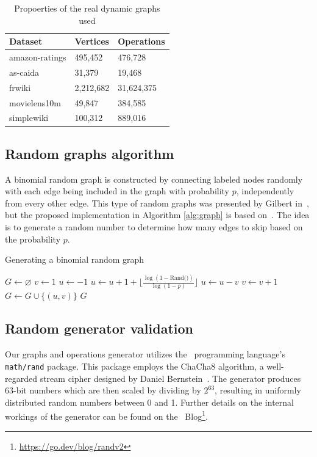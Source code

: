 \begin{table}[H]
\centering
\begin{tabular}{@{}lll@{}}
\toprule
Dataset        & Vertices  & Operations \\ \midrule
amazon-ratings & 495,452   & 476,728     \\
as-caida       & 31,379    & 19,468      \\
frwiki         & 2,212,682 & 31,624,375  \\
movielens10m   & 49,847    & 384,585     \\
simplewiki     & 100,312   & 889,016     \\ \bottomrule
\end{tabular}
\caption{Propoerties of the real dynamic graphs used \label{tab:dyngraphs}}
\end{table}

    \subsection*{Random graphs algorithm \label{sec:exp:rand_graph}}
    A binomial random graph is constructed by connecting labeled nodes randomly with each edge being included in the graph with probability $p$, independently from every other edge. This type of random graphs was presented by Gilbert in~\cite{Gilbert1959}, but the proposed implementation in Algorithm \ref{alg:graph} is based on~\cite{Batagelj2005}. The idea is to generate a random number to determine how many edges to skip based on the probability $p$.
    
    \begin{algorithm}[H]
    \caption{Generating a binomial random graph \label{alg:graph}}
    \begin{algorithmic}
            \State $G \gets \varnothing$
            \State $v \gets 1$
            \State $u \gets -1$
                \State $u \gets u + 1 + \lfloor\frac{\log{(1 - \text{Rand()})}}{\log{(1-p)}}\rfloor$
                    \State $u \gets u - v$
                    \State $v \gets v + 1$
                \EndWhile
                    \State $G \gets G \cup \{(u,v)\}$
                \EndIf
            \EndWhile
            \State \Return $G$
        \EndProcedure
    \end{algorithmic}
    \end{algorithm}

    \subsection*{Random generator validation}
    Our graphs and operations generator utilizes the \Go\ programming language's \verb|math/rand| package. This package employs the ChaCha8 algorithm, a well-regarded stream cipher designed by Daniel Bernstein~\cite{bernstein2008chacha}. The generator produces 63-bit numbers which are then scaled by dividing by $2^{63}$, resulting in uniformly distributed random numbers between 0 and 1. Further details on the internal workings of the generator can be found on the \Go\ Blog\footnote{\href{https://go.dev/blog/randv2}{https://go.dev/blog/randv2}}.
    
